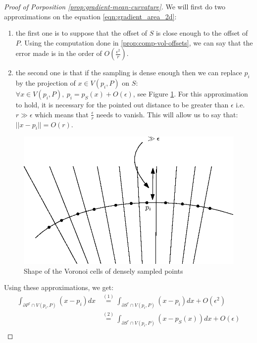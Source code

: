 \begin{proof}[Proof of Porposition \ref{prop:gradient-mean-curvature}]
We will first do two approximations on the equation \eqref{eqn:gradient_area_2d}:
\begin{enumerate}
    \item the first one is to suppose that the offset of $ S $ is close enough
        to the offset of $ P $. Using the computation done in
        \ref{prop:comp-vol-offsets}, we can say that the error made is in the
        order of $ O(\frac{\epsilon^2}{r}) $.
    \item the second one is that if the sampling is dense enough then we can
        replace $ p_i $ by the projection of $ x \in V(p_i, P) $ on $ S $: $
        \forall x \in V(p_i, P),~p_i = p_S(x) + O(\epsilon) $, see Figure
        \ref{fig:voronoi-cylinder}.  For this approximation to hold, it is
        necessary for the pointed out distance to be greater than $ \epsilon $
        i.e. $ r \gg \epsilon $ which means that $ \frac{\epsilon}{r} $ needs to
        vanish. This will allow us to say that: $ || x - p_i || = O(r) $.
\end{enumerate}

\begin{figure}[h]
    \centering
    \includegraphics[scale=0.6]{img/voronoi-cylinder}
    \caption{Shape of the Voronoi cells of densely sampled points}
    \label{fig:voronoi-cylinder}
\end{figure}

Using these approximations, we get:
\begin{align*}
    \int_{\partial{P^r} \cap V(p_i, P)} (x - p_i) dx & \stackrel{(1)}{=}
    \int_{\partial{S^r} \cap V(p_i,
        P)} (x - p_i) dx + O(\epsilon^2) \\
    &\stackrel{(2)}{=} \int_{\partial{S^r} \cap V(p_i, P)} (x - p_S(x)) dx +
    O(\epsilon) \\
\end{align*}


\end{proof}
